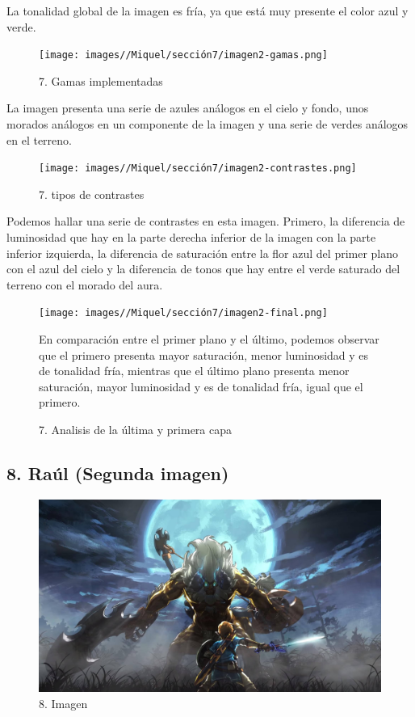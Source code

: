 \documentclass[12pt]{article}
\begin{document}
     La tonalidad global de la imagen es fría, ya que está muy presente el color azul y verde.   

\begin{figure}[H]
      \centering
      \texttt{[image: images//Miquel/sección7/imagen2-gamas.png]}
      \caption{\small 7. Gamas implementadas}
    \end{figure}
  
    La imagen presenta una serie de azules análogos en el cielo y fondo, unos morados análogos en un componente de la imagen y una serie de verdes análogos en el terreno.

\begin{figure}[H]
      \centering
      \texttt{[image: images//Miquel/sección7/imagen2-contrastes.png]}
      \caption{\small 7. tipos de contrastes}
    \end{figure}
    
    Podemos hallar una serie de contrastes en esta imagen. Primero, la diferencia de luminosidad que hay en la parte derecha inferior de la imagen con la parte inferior izquierda, la diferencia de saturación entre la flor azul del primer plano con el azul del cielo  y la diferencia de tonos que hay entre el verde saturado del terreno con el morado del aura.

    \begin{figure}[H]
      \centering
      \texttt{[image: images//Miquel/sección7/imagen2-final.png]}
      \caption{\small 7. Analisis de la última y primera capa}

    En comparación entre el primer plano y el último, podemos observar que el primero presenta mayor saturación, menor luminosidad y es de tonalidad fría, mientras que el último plano presenta menor saturación, mayor luminosidad y es de tonalidad fría, igual que el primero.


    \end{figure}

    \subsection{8. Raúl (Segunda imagen)}
    \begin{figure}[H]
      \centering
      \includegraphics[width=\textwidth]{images/Concepts/8_concept_art}
      \caption{\small 8. Imagen}
    \end{figure}
\end{document}
